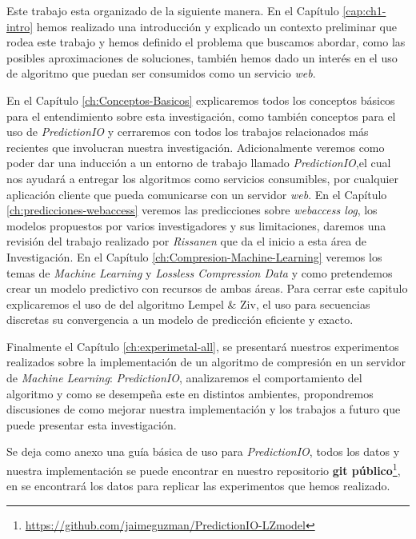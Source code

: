 
Este trabajo esta organizado de la siguiente manera. En el Capítulo \ref{cap:ch1-intro} hemos realizado una introducción y  explicado un contexto preliminar que rodea este trabajo y hemos definido el problema que buscamos abordar, como las posibles aproximaciones de soluciones, también hemos dado un interés en el uso de algoritmo que puedan ser consumidos como un servicio \emph{web}.

En el Capítulo \ref{ch:Conceptos-Basicos} explicaremos todos los conceptos básicos para el entendimiento sobre esta investigación, como también conceptos para el uso de \emph{PredictionIO} y cerraremos con todos los trabajos relacionados más recientes que involucran nuestra investigación. Adicionalmente veremos como poder dar una inducción a un entorno de trabajo llamado \emph{PredictionIO},el cual nos ayudará a entregar los algoritmos como servicios consumibles, por cualquier aplicación cliente que pueda comunicarse con un servidor \emph{web}. En el Capítulo \ref{ch:predicciones-webaccess} veremos las predicciones sobre \emph{webaccess log}, los modelos propuestos por varios investigadores y sus limitaciones, daremos una revisión del trabajo realizado por \emph{Rissanen}\cite{Rissanen1984} que da el inicio a esta área de Investigación.
En el Capítulo \ref{ch:Compresion-Machine-Learning} veremos los temas de \emph{Machine Learning} y \emph{Lossless Compression Data} y como pretendemos crear un modelo predictivo con recursos de ambas áreas. Para cerrar este capitulo explicaremos el uso de del algoritmo Lempel \& Ziv, el uso para secuencias discretas su convergencia a un modelo de predicción eficiente y exacto. 

Finalmente el Capítulo \ref{ch:experimetal-all}, se presentará nuestros experimentos realizados sobre la implementación de un algoritmo de compresión en un servidor de \emph{Machine Learning}: \emph{PredictionIO}, analizaremos el comportamiento del algoritmo y como se desempeña este en distintos ambientes, propondremos discusiones de como mejorar nuestra implementación y los trabajos a futuro que puede presentar esta investigación.

Se deja como anexo una guía básica de uso para \emph{PredictionIO}, todos los datos y nuestra implementación se puede encontrar en nuestro repositorio \textbf{git público}\footnote{\url{https://github.com/jaimeguzman/PredictionIO-LZmodel}}, en se encontrará  los datos para replicar las experimentos que hemos realizado. 
